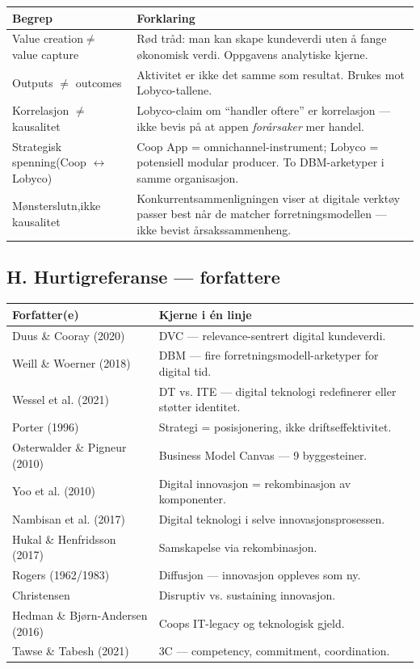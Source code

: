 \begin{tabular}{p{4cm}p{12cm}}
\hline
\textbf{Begrep} & \textbf{Forklaring} \\
\hline
Value creation\newline $\neq$ value capture & Rød tråd: man kan skape
kundeverdi uten å fange økonomisk verdi. Oppgavens analytiske kjerne. \\
\hline
Outputs $\neq$ outcomes & Aktivitet er ikke det samme som resultat. Brukes mot
Lobyco-tallene. \\
\hline
Korrelasjon $\neq$\newline kausalitet & Lobyco-claim om ``handler oftere'' er
korrelasjon --- ikke bevis på at appen \emph{forårsaker} mer handel. \\
\hline
Strategisk spenning\newline (Coop $\leftrightarrow$ Lobyco) & Coop App =
omnichannel-instrument; Lobyco = potensiell modular producer. To
DBM-arketyper i samme organisasjon. \\
\hline
Mønsterslutn,\newline ikke kausalitet & Konkurrentsammenligningen viser at
digitale verktøy passer best når de matcher forretningsmodellen --- ikke
bevist årsakssammenheng. \\
\hline
\end{tabular}

\subsection*{H. Hurtigreferanse --- forfattere}

\begin{tabular}{p{4.5cm}p{11.5cm}}
\hline
\textbf{Forfatter(e)} & \textbf{Kjerne i én linje} \\
\hline
Duus \& Cooray (2020) & DVC --- relevance-sentrert digital kundeverdi. \\
\hline
Weill \& Woerner (2018) & DBM --- fire forretningsmodell-arketyper for digital
tid. \\
\hline
Wessel et al. (2021) & DT vs. ITE --- digital teknologi redefinerer eller
støtter identitet. \\
\hline
Porter (1996) & Strategi = posisjonering, ikke driftseffektivitet. \\
\hline
Osterwalder \& Pigneur (2010) & Business Model Canvas --- 9 byggesteiner. \\
\hline
Yoo et al. (2010) & Digital innovasjon = rekombinasjon av komponenter. \\
\hline
Nambisan et al. (2017) & Digital teknologi i selve innovasjonsprosessen. \\
\hline
Hukal \& Henfridsson (2017) & Samskapelse via rekombinasjon. \\
\hline
Rogers (1962/1983) & Diffusjon --- innovasjon oppleves som ny. \\
\hline
Christensen & Disruptiv vs. sustaining innovasjon. \\
\hline
Hedman \& Bjørn-Andersen (2016) & Coops IT-legacy og teknologisk gjeld. \\
\hline
Tawse \& Tabesh (2021) & 3C --- competency, commitment, coordination. \\
\hline
\end{tabular}
